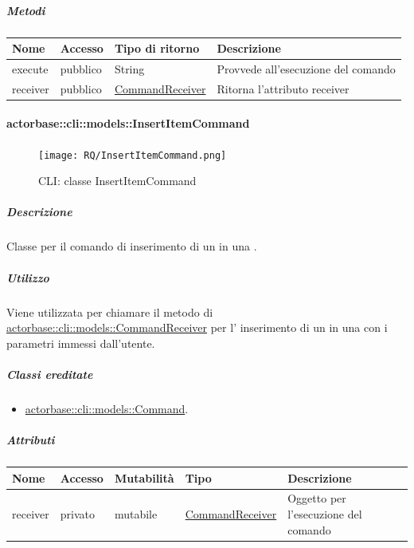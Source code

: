 \documentclass{scalatekids-article}
\begin{document}
\subparagraph{Metodi}

\begin{tabular}{| l | l | l | l |}
  \hline
  Nome & Accesso & Tipo di ritorno & Descrizione\\
  \hline
  execute & pubblico & String & Provvede all'esecuzione del comando\\
  \hline
  receiver & pubblico & \hyperref[sec:actorbase::cli::models::CommandReceiver]{CommandReceiver} & Ritorna l'attributo receiver\\
  \hline
\end{tabular}

\paragraph{actorbase::cli::models::InsertItemCommand}
\label{sec:actorbase::cli::models::InsertItemCommand}

\begin{figure}[H]
  \begin{center}
    \texttt{[image: RQ/InsertItemCommand.png]}
    \caption{CLI: classe InsertItemCommand}
  \end{center}
\end{figure}

\subparagraph{Descrizione}

Classe per il comando di inserimento di un  in una
.

\subparagraph{Utilizzo}

Viene utilizzata per chiamare il metodo di \hyperref[sec:actorbase::cli::models::CommandReceiver]{actorbase::cli::models::CommandReceiver} per l' inserimento di un  in una  con i parametri immessi dall'utente.

\subparagraph{Classi ereditate}

\begin{itemize}
\item \hyperref[sec:actorbase::cli::models::Command]{actorbase::cli::models::Command}.
\end{itemize}

\subparagraph{Attributi}

\begin{tabular}{| p{1cm} | p{1.5cm} | p{2cm} | p{4cm} | p{8.5cm} |}
  \hline
  Nome & Accesso & Mutabilità & Tipo & Descrizione\\
  \hline
  receiver & privato & mutabile & \hyperref[sec:actorbase::cli::models::CommandReceiver]{CommandReceiver} & Oggetto per l'esecuzione del comando\\
  \hline
\end{tabular}
\end{document}
